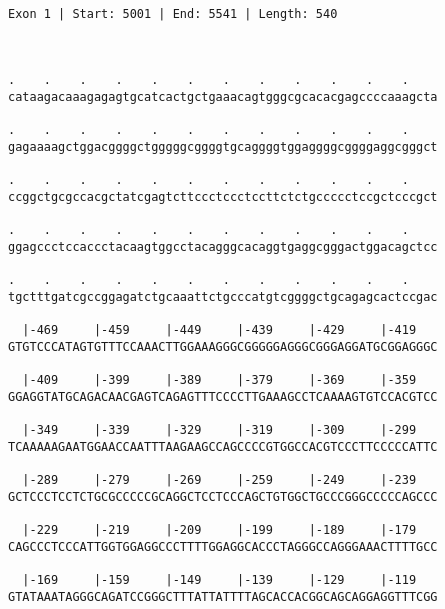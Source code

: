 \documentclass{article}
\begin{document}
 \begin{Verbatim}
 
Exon 1 | Start: 5001 | End: 5541 | Length: 540



.    .    .    .    .    .    .    .    .    .    .    .    
cataagacaaagagagtgcatcactgctgaaacagtgggcgcacacgagccccaaagcta
                                                            
.    .    .    .    .    .    .    .    .    .    .    .    
gagaaaagctggacggggctgggggcggggtgcaggggtggaggggcggggaggcgggct
                                                            
.    .    .    .    .    .    .    .    .    .    .    .    
ccggctgcgccacgctatcgagtcttccctccctccttctctgccccctccgctcccgct
                                                            
.    .    .    .    .    .    .    .    .    .    .    .    
ggagccctccaccctacaagtggcctacagggcacaggtgaggcgggactggacagctcc
                                                            
.    .    .    .    .    .    .    .    .    .    .    .    
tgctttgatcgccggagatctgcaaattctgcccatgtcggggctgcagagcactccgac
                                                            
  |-469     |-459     |-449     |-439     |-429     |-419   
GTGTCCCATAGTGTTTCCAAACTTGGAAAGGGCGGGGGAGGGCGGGAGGATGCGGAGGGC
                                                            
  |-409     |-399     |-389     |-379     |-369     |-359   
GGAGGTATGCAGACAACGAGTCAGAGTTTCCCCTTGAAAGCCTCAAAAGTGTCCACGTCC
                                                            
  |-349     |-339     |-329     |-319     |-309     |-299   
TCAAAAAGAATGGAACCAATTTAAGAAGCCAGCCCCGTGGCCACGTCCCTTCCCCCATTC
                                                            
  |-289     |-279     |-269     |-259     |-249     |-239   
GCTCCCTCCTCTGCGCCCCCGCAGGCTCCTCCCAGCTGTGGCTGCCCGGGCCCCCAGCCC
                                                            
  |-229     |-219     |-209     |-199     |-189     |-179   
CAGCCCTCCCATTGGTGGAGGCCCTTTTGGAGGCACCCTAGGGCCAGGGAAACTTTTGCC
                                                            
  |-169     |-159     |-149     |-139     |-129     |-119   
GTATAAATAGGGCAGATCCGGGCTTTATTATTTTAGCACCACGGCAGCAGGAGGTTTCGG
                                                            

\end{Verbatim}
\end{document}

